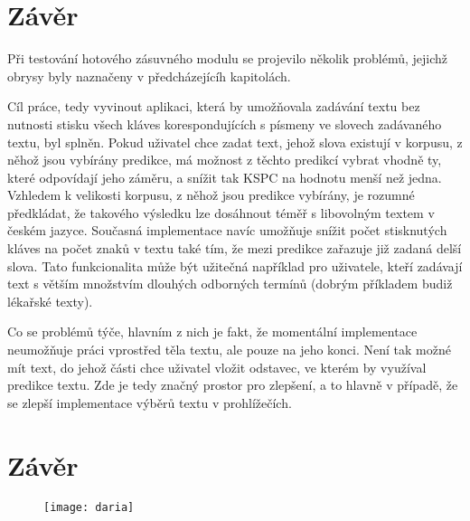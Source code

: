 \documentclass[a4paper,11pt]{article}
\begin{document}
\section{Závěr}

Při testování hotového zásuvného modulu se projevilo několik problémů, jejichž obrysy byly naznačeny v předcházejícíh kapitolách. 

Cíl práce, tedy vyvinout aplikaci, která by umožňovala zadávání textu bez nutnosti stisku všech kláves korespondujících s písmeny ve slovech zadávaného textu, byl splněn. Pokud uživatel chce zadat text, jehož slova existují v korpusu, z něhož jsou vybírány predikce, má možnost z těchto predikcí vybrat vhodně ty, které odpovídají jeho záměru, a snížit tak KSPC na hodnotu menší než jedna. Vzhledem k velikosti korpusu, z něhož jsou predikce vybírány, je rozumné předkládat, že takového výsledku lze dosáhnout téměř s libovolným textem v českém jazyce. Současná implementace navíc umožňuje snížit počet stisknutých kláves na počet znaků v textu také tím, že mezi predikce zařazuje již zadaná delší slova. Tato funkcionalita může být užitečná například pro uživatele, kteří zadávají text s větším množstvím dlouhých odborných termínů (dobrým příkladem budiž lékařské texty).

Co se problémů týče, hlavním z nich je fakt, že momentální implementace neumožňuje práci vprostřed těla textu, ale pouze na jeho konci. Není tak možné mít text, do jehož části chce uživatel vložit odstavec, ve kterém by využíval predikce textu. Zde je tedy značný prostor pro zlepšení, a to hlavně v případě, že se zlepší implementace výběrů textu v prohlížečích.


\section*{Závěr}

\begin{figure}[h]
	\centering
	\texttt{[image: daria]}
\end{figure}




\newpage

\printbibliography[title={Seznam literatury}]
\end{document}
